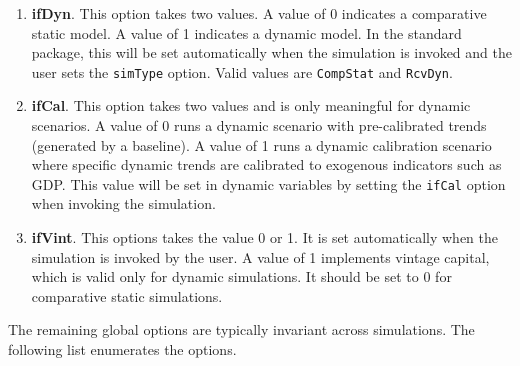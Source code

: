 \begin{enumerate}
   \item \textbf{ifDyn}. This option takes two values. A value of 0 indicates a
         comparative static model. A value of 1 indicates a dynamic model. In
         the standard package, this will be set automatically when the
         simulation is invoked and the user sets the \texttt{simType} option.
         Valid values are \texttt{CompStat} and \texttt{RcvDyn}.
   \item \textbf{ifCal}. This option takes two values and is only meaningful for
         dynamic scenarios. A value of 0 runs a dynamic scenario with
         pre-calibrated trends (generated by a baseline). A value of 1 runs a
         dynamic calibration scenario where specific dynamic trends are
         calibrated to exogenous indicators such as GDP. This value will be set
         in dynamic variables by setting the \texttt{ifCal} option when invoking
         the simulation.
   \item \textbf{ifVint}. This options takes the value 0 or 1. It is set
         automatically when the simulation is invoked by the user. A value of 1
         implements vintage capital, which is valid only for dynamic
         simulations. It should be set to 0 for comparative static simulations.
\end{enumerate}

The remaining global options are typically invariant across simulations. The
following list enumerates the options.

